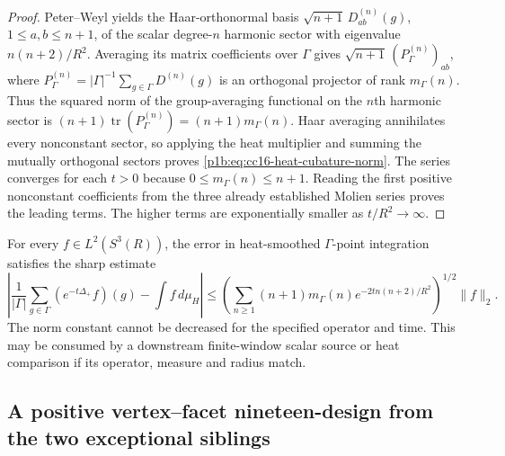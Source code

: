 \documentclass[11pt]{article}
\begin{document}
\begin{proof}
Peter--Weyl yields the Haar-orthonormal basis
$\sqrt{n+1}\,D^{(n)}_{ab}(g)$, $1\leq a,b\leq n+1$, of the
scalar degree-$n$ harmonic sector with eigenvalue
$n(n+2)/R^2$. Averaging its matrix coefficients over $\Gamma$
gives $\sqrt{n+1}\,(P_\Gamma^{(n)})_{ab}$, where
$P_\Gamma^{(n)}=|\Gamma|^{-1}\sum_{g\in\Gamma}D^{(n)}(g)$
is an orthogonal projector of rank $m_\Gamma(n)$.
Thus the squared norm of the group-averaging functional on the
$n$th harmonic sector is
$(n+1)\operatorname{tr}(P_\Gamma^{(n)})
=(n+1)m_\Gamma(n)$. Haar averaging annihilates every nonconstant
sector, so applying the heat multiplier and summing the mutually
orthogonal sectors proves \eqref{p1b:eq:cc16-heat-cubature-norm}.
The series converges for each $t>0$ because
$0\le m_\Gamma(n)\le n+1$.
Reading the first positive nonconstant coefficients from the three
already established Molien series proves the leading terms. The
higher terms are exponentially smaller as $t/R^2\to\infty$.
\end{proof}
\begin{corollary}
\label{p1b:cor:cc16-heat-source-bound}
For every $f\in L^2(S^3(R))$, the error in heat-smoothed
$\Gamma$-point integration satisfies the sharp estimate
\[
 \left|\frac1{|\Gamma|}\sum_{g\in\Gamma}(e^{-t\Delta_+}f)(g)
 -\int f\,d\mu_H\right|
 \leq\left(\sum_{n\ge1}(n+1)m_\Gamma(n)e^{-2tn(n+2)/R^2}\right)^{1/2}
 \|f\|_2.
\]
The norm constant cannot be decreased for the specified operator
and time. This may be consumed by a downstream finite-window scalar
source or heat comparison if its operator, measure and radius match.
\end{corollary}


\subsection{A positive vertex--facet nineteen-design from the two exceptional siblings}
\label{p1b:sec:cc17-vertex-facet-positive-rule}
\end{document}
